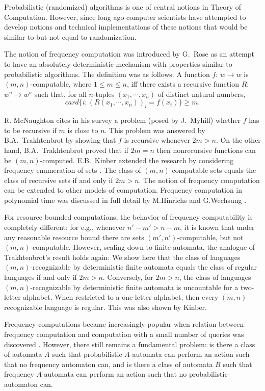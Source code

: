 \documentclass{llncs}
\begin{document}
Probabilistic (randomized) algorithms is one of central notions in Theory of Computation. However, since long ago computer scientists have attempted to develop notions and technical implementations of these notions that would be similar to but not equal to randomization.
 

The notion of frequency computation was introduced by G.~Rose \cite{R60} as an attempt to have an absolutely deterministic mechanism with properties similar to probabilistic algorithms. The definition was as follows. A function $f$: $w \to w$ is $(m,n)$-computable, where $1 \leq m \leq n$, iff there exists a recursive function $R$: $w^n \to w^n$ such that, for all $n$-tuples $(x_1, \cdots , x_n)$ of distinct natural numbers,
$$
card\{i: (R(x_1,\cdots , x_n))_i = f(x_i)\} \geq m.
$$

R. McNaughton cites in his survey \cite{M61} a problem (posed by J.~Myhill) whether $f$ has  to be recursive if $m$ is close to $n$. This problem was answered by B.A.~Trakhtenbrot \cite{T64} by showing that $f$ is recursive whenever $2m > n$. On the other hand, B.A.~Trakhtenbrot \cite{T64} proved that if $2m = n$ then nonrecursive functions can be $(m,n)$-computed. E.B.~Kinber extended the research  by considering frequency enumeration of sets \cite{K72}. The class of $(m, n)$-computable sets equals the class of recursive sets if and only if $2m > n$. The notion of frequency computation can be extended to other models of computation.
Frequency computation in polynomial time was discussed in full detail by M.Hinrichs and G.Wechsung \cite{HW97}. 


 For resource bounded computations, the behavior of frequency computability is completely different: for e.g., whenever $n' - m' > n - m$, it is known that under any reasonable resource bound there are sets $(m', n')$-computable, but not $(m, n)$-computable. However, scaling down to finite automata, the analogue of Trakhtenbrot's result holds again: We show here that the class of languages $(m, n)$-recognizable by deterministic finite automata equals the class of regular languages if and only if $2m > n$.   Conversely, for
  $2m > n$, the class of languages $(m, n)$-recognizable by deterministic finite automata \cite{ADHP05} is uncountable for a two-letter alphabet. When restricted to a one-letter alphabet, then every $(m,n)$-recognizable language is regular. This was also shown by Kinber.
  
Frequency computations became increasingly popular when relation between frequency computation and computation with a small number of queries was discovered \cite{K92,HKO92,BGK96,CKKK97}.   However, there still remains a fundamental problem: is there a class of automata $A$ such that probabilistic $A$-automata can perform an action such that no frequency automaton can, and is there a class of automata $B$ such that frequency $A$-automata can perform an action such that no probabilistic automaton can.
\end{document}
